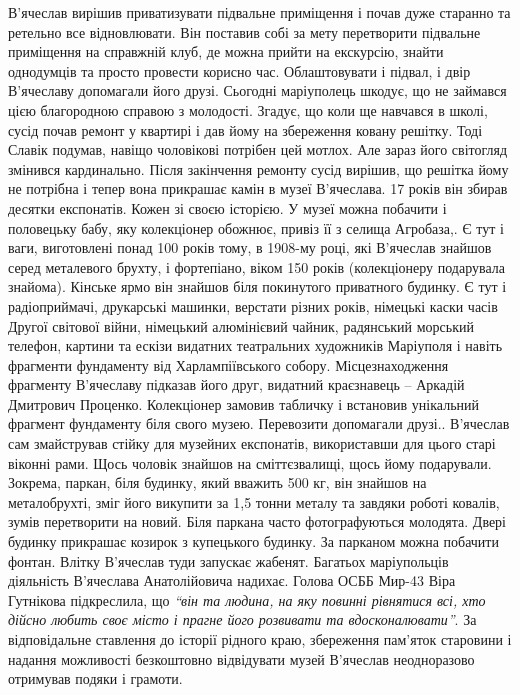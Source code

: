 В'ячеслав вирішив приватизувати підвальне приміщення і почав дуже старанно та
ретельно все відновлювати. Він поставив собі за мету перетворити підвальне
приміщення на справжній клуб, де можна прийти на екскурсію, знайти однодумців
та просто провести корисно час. Облаштовувати і підвал, і двір В'ячеславу
допомагали його друзі. Сьогодні маріуполець шкодує, що не займався цією
благородною справою з молодості. Згадує, що коли ще навчався в школі, сусід
почав ремонт у квартирі і дав йому на збереження ковану решітку. Тоді Славік
подумав, навіщо чоловікові потрібен цей мотлох. Але зараз його світогляд
змінився кардинально. Після закінчення ремонту сусід вирішив, що решітка йому
не потрібна і тепер вона прикрашає камін в музеї В'ячеслава. 17 років він
збирав десятки експонатів. Кожен зі своєю історією. У музеї можна побачити і
половецьку бабу, яку колекціонер обожнює, привіз її з селища Агробаза,. Є тут і
ваги, виготовлені понад 100 років тому, в 1908-му році, які В'ячеслав знайшов
серед металевого брухту, і фортепіано, віком 150 років (колекціонеру подарувала
знайома). Кінське ярмо він знайшов біля покинутого приватного будинку. Є тут і
радіоприймачі, друкарські машинки, верстати різних років, німецькі каски часів
Другої світової війни, німецький алюмінієвий чайник, радянський морський
телефон, картини та ескізи видатних театральних художників Маріуполя і навіть
фрагменти фундаменту від Харлампіївського собору. Місцезнаходження фрагменту
В'ячеславу підказав його друг, видатний краєзнавець – Аркадій Дмитрович
Проценко.  Колекціонер замовив табличку і встановив унікальний фрагмент
фундаменту біля свого музею. Перевозити допомагали друзі.. В'ячеслав сам
змайстрував стійку для музейних експонатів, використавши для цього старі
віконні рами. Щось чоловік знайшов на сміттєзвалищі, щось йому подарували.
Зокрема, паркан, біля будинку, який вважить 500 кг, він знайшов на
металобрухті, зміг його викупити за 1,5 тонни металу та завдяки роботі ковалів,
зумів перетворити на новий. Біля паркана часто фотографуються молодята. Двері
будинку прикрашає козирок з купецького будинку. За парканом можна побачити
фонтан. Влітку В'ячеслав туди запускає жабенят. Багатьох маріупольців
діяльність В'ячеслава Анатолійовича надихає. Голова ОСББ Мир-43 Віра Гутнікова
підкреслила, що \emph{\enquote{він та людина, на яку повинні рівнятися всі, хто дійсно любить
своє місто і прагне його розвивати та вдосконалювати}}. За відповідальне
ставлення до історії рідного краю, збереження пам'яток старовини і надання
можливості безкоштовно відвідувати музей В'ячеслав  неодноразово отримував
подяки і грамоти. 


